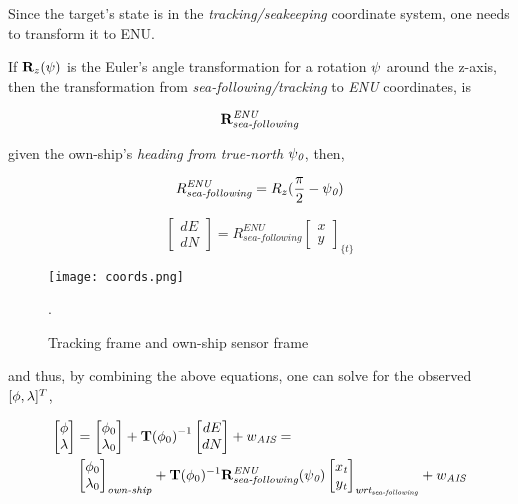 Since the target's state is in the \emph{tracking/seakeeping} coordinate system, one needs to transform it to ENU.

If $\mathbf{R}_z({\psi})$ is the Euler's angle transformation for a rotation ${\psi}$ around the z-axis, then the transformation from \emph{sea-following/tracking} to \emph{ENU} coordinates, is

$$\mathbf{R}^{\textit{ENU}}_{\textit{sea-following}} $$

given the own-ship's \emph{heading from true-north} ${\psi}_{\textit{0}}$, then,


\begin{equation}
R_{\textit{sea-following}}^{\textit{ENU}} = R_{z}(\frac{\pi}{2}-{\psi}_{\textit{0}})
\end{equation}


\begin{equation}
\begin{bmatrix}
dE\\ dN
\end{bmatrix}=
R_{\textit{sea-following}}^{\textit{ENU}}
\begin{bmatrix}
x\\ y
\end{bmatrix}_{\textit{\{t\}}}
\end{equation}


\begin{figure}[H]
	\centering
	\texttt{[image: coords.png]}
	\caption{Tracking frame and own-ship sensor frame}.
	\label{fig:track_vs_own_ship}
\end{figure}



and thus, by combining the above equations, one can solve for the observed $[{\phi}, {\lambda}]^{T}$,

\begin{equation}
\begin{aligned}
\begin{bmatrix}
{\phi}\\ {\lambda}
\end{bmatrix}&=
\begin{bmatrix}
{\phi}_{0}\\ {\lambda}_{0}
\end{bmatrix} + {\mathbf{T}({\phi}_{0})}^{-1}\begin{bmatrix}
dE\\ dN
\end{bmatrix} + {w}_{\textit{AIS}}=  \\
&\begin{bmatrix}
{\phi}_{0}\\ {\lambda}_{0}
\end{bmatrix}_{\textit{own-ship}} + \mathbf{T}({\phi}_{0})^{-1}
\mathbf{R}^{\textit{ENU}}_{\textit{sea-following}}({\psi}_{\textit{0}})
\begin{bmatrix}
x_{\textit{t}}\\ y_{\textit{t}}
\end{bmatrix}_{\textit{wrt}_{{\textit{sea-following}}}}+{w}_{\textit{AIS}}
\end{aligned}
\end{equation}


